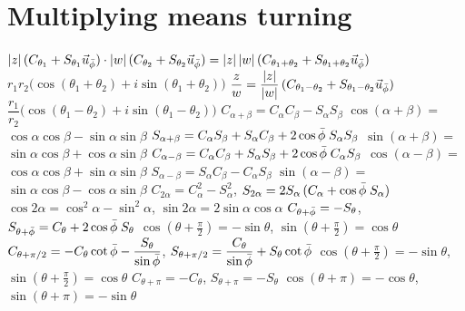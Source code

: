\section{Multiplying means turning}\label{app:f-turning}

\begin{gnlaws}
  {$|z|\,(C_{\theta_1} + S_{\theta_1}\vec{u}_{\bar{\phi}}) \cdot |w|\,(C_{\theta_2} + S_{\theta_2}\vec{u}_{\bar{\phi}}) = |z|\,|w|\,(C_{\theta_1 + \theta_2} + S_{\theta_1 + \theta_2}\vec{u}_{\bar{\phi}})$}
  {$r_1r_2\bigl(\cos(\theta_1 + \theta_2) + i\sin(\theta_1 + \theta_2)\bigr)$}
  {$\dfrac{z}{w} = \dfrac{|z|}{|w|}\,(C_{\theta_1 - \theta_2} + S_{\theta_1 - \theta_2}\vec{u}_{\bar{\phi}})$}
  {$\dfrac{r_1}{r_2}\bigl(\cos(\theta_1 - \theta_2) + i\sin(\theta_1 - \theta_2)\bigr)$}
  {$C_{\alpha + \beta} = C_\alpha C_\beta - S_\alpha S_\beta$}
  {$\cos(\alpha + \beta) = {}$ \newline $\cos\alpha\cos\beta - \sin\alpha\sin\beta$}
  {$S_{\alpha + \beta} = C_\alpha S_\beta + S_\alpha C_\beta + 2\cos\bar{\phi}\;S_\alpha S_\beta$}
  {$\sin(\alpha + \beta) = {}$ \newline $\sin\alpha\cos\beta + \cos\alpha\sin\beta$}
  {$C_{\alpha - \beta} = C_\alpha C_\beta + S_\alpha S_\beta + 2\cos\bar{\phi}\;C_\alpha S_\beta$}
  {$\cos(\alpha - \beta) = {}$ \newline $\cos\alpha\cos\beta + \sin\alpha\sin\beta$}
  {$S_{\alpha - \beta} = S_\alpha C_\beta - C_\alpha S_\beta$}
  {$\sin(\alpha - \beta) = {}$ \newline $\sin\alpha\cos\beta - \cos\alpha\sin\beta$}
  {$C_{2\alpha} = C_\alpha^2 - S_\alpha^2$, \quad $S_{2\alpha} = 2S_\alpha\,(C_\alpha + \cos\bar{\phi}\;S_\alpha)$}
  {$\cos 2\alpha = \cos^2\alpha - \sin^2\alpha$, \newline $\sin 2\alpha = 2\sin\alpha\cos\alpha$}
  {$C_{\theta + \bar{\phi}} = -S_\theta$, \quad $S_{\theta + \bar{\phi}} = C_\theta + 2\cos\bar{\phi}\;S_\theta$}
  {$\cos(\theta + \tfrac{\pi}{2}) = -\sin\theta$, \newline $\sin(\theta + \tfrac{\pi}{2}) = \cos\theta$}
  {$C_{\theta + \pi/2} = -C_\theta\cot\bar{\phi} - \dfrac{S_\theta}{\sin\bar{\phi}}$, \quad $S_{\theta + \pi/2} = \dfrac{C_\theta}{\sin\bar{\phi}} + S_\theta\cot\bar{\phi}$}
  {$\cos(\theta + \tfrac{\pi}{2}) = -\sin\theta$, \newline $\sin(\theta + \tfrac{\pi}{2}) = \cos\theta$}
  {$C_{\theta + \pi} = -C_\theta$, \quad $S_{\theta + \pi} = -S_\theta$}
  {$\cos(\theta + \pi) = -\cos\theta$, \newline $\sin(\theta + \pi) = -\sin\theta$}
\end{gnlaws}
